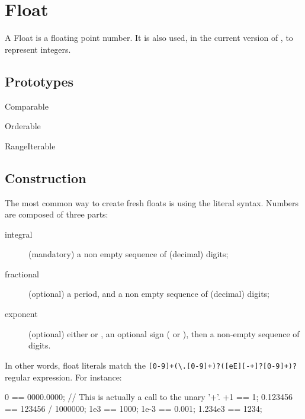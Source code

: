 
\section{Float}

A Float is a floating point number.  It is also used, in the current
version of \us, to represent integers.

\subsection{Prototypes}

\begin{refObjects}
\item[Comparable]
\item[Orderable]
\item[RangeIterable]
\end{refObjects}

\subsection{Construction}
\label{sec:float:ctor}

The most common way to create fresh floats is using the literal
syntax.  Numbers are composed of three parts:
\begin{description}
\item[integral] (mandatory) a non empty sequence of (decimal) digits;
\item[fractional] (optional) a period, and a non empty sequence of
  (decimal) digits;
\item[exponent] (optional) either  or , an optional
  sign (\samp{+} or \samp{-}), then a non-empty sequence of digits.
\end{description}

In other words, float literals match the
\lstinline|[0-9]+(\.[0-9]+)?([eE][-+]?[0-9]+)?| regular expression.  For
instance:

\begin{urbiassert}
0 == 0000.0000;
// This is actually a call to the unary '+'.
+1 == 1;
0.123456 == 123456 / 1000000;
1e3 == 1000;
1e-3 == 0.001;
1.234e3 == 1234;
\end{urbiassert}

